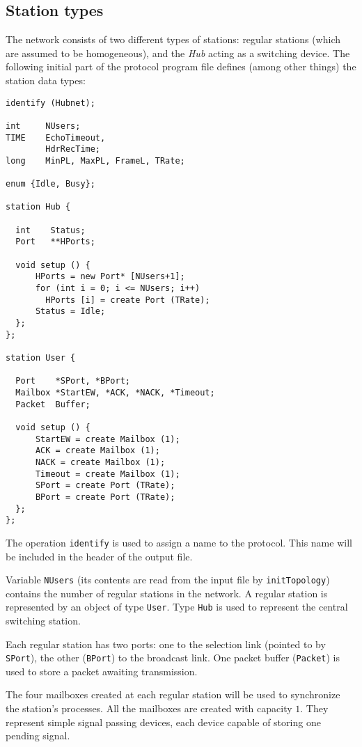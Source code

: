 \subsection{Station types}

The network consists of two different types of stations: regular stations
(which are assumed to be homogeneous), and the {\em Hub} acting as a
switching device.
The following initial part of the protocol program file
defines (among other things) the station data types:

{\small
\begin{verbatim}
identify (Hubnet);

int     NUsers;
TIME    EchoTimeout,
        HdrRecTime;
long    MinPL, MaxPL, FrameL, TRate;

enum {Idle, Busy};

station Hub {

  int    Status;
  Port   **HPorts;

  void setup () {
      HPorts = new Port* [NUsers+1];
      for (int i = 0; i <= NUsers; i++)
        HPorts [i] = create Port (TRate);
      Status = Idle;
  };
};

station User {

  Port    *SPort, *BPort;
  Mailbox *StartEW, *ACK, *NACK, *Timeout;
  Packet  Buffer;

  void setup () {
      StartEW = create Mailbox (1);
      ACK = create Mailbox (1);
      NACK = create Mailbox (1);
      Timeout = create Mailbox (1);
      SPort = create Port (TRate);
      BPort = create Port (TRate);
  };
};
\end{verbatim} }

The operation {\tt identify} is used to assign a name to the protocol.
This name will be included in the header of the output file.

Variable {\tt NUsers} (its contents are read from the input file by
{\tt initTopology})
contains the number of regular stations in the network.
A regular station is represented by an object of type {\tt User}.
Type {\tt Hub} is used to represent the central switching station.

Each regular station has two ports: one to the selection link (pointed to
by {\tt SPort}), the other ({\tt BPort}) to the broadcast link.
One packet buffer ({\tt Packet}) is used to store a packet awaiting
transmission.

The four mailboxes created at each regular station will be used to synchronize
the station's processes.
All the mailboxes are created with capacity $1$.
They represent simple signal passing devices, each device capable of storing
one pending signal.

